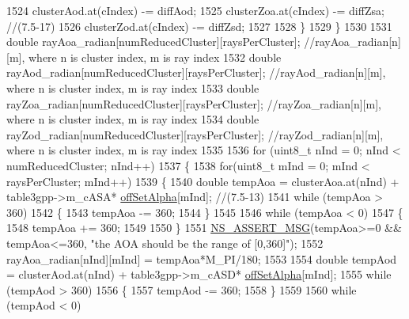 \begin{DoxyCode}
1524                         clusterAod.at(cIndex) -= diffAod;
1525                         clusterZoa.at(cIndex) -= diffZsa; \textcolor{comment}{//(7.5-17)}
1526                         clusterZod.at(cIndex) -= diffZsd;
1527 
1528                 \}
1529         \}
1530 
1531         \textcolor{keywordtype}{double} rayAoa\_radian[numReducedCluster][raysPerCluster]; \textcolor{comment}{//rayAoa\_radian[n][m], where n is cluster
       index, m is ray index}
1532         \textcolor{keywordtype}{double} rayAod\_radian[numReducedCluster][raysPerCluster]; \textcolor{comment}{//rayAod\_radian[n][m], where n is cluster
       index, m is ray index}
1533         \textcolor{keywordtype}{double} rayZoa\_radian[numReducedCluster][raysPerCluster]; \textcolor{comment}{//rayZoa\_radian[n][m], where n is cluster
       index, m is ray index}
1534         \textcolor{keywordtype}{double} rayZod\_radian[numReducedCluster][raysPerCluster]; \textcolor{comment}{//rayZod\_radian[n][m], where n is cluster
       index, m is ray index}
1535 
1536         \textcolor{keywordflow}{for} (uint8\_t nInd = 0; nInd < numReducedCluster; nInd++)
1537         \{
1538                 \textcolor{keywordflow}{for}(uint8\_t mInd = 0; mInd < raysPerCluster; mInd++)
1539                 \{
1540                         \textcolor{keywordtype}{double} tempAoa = clusterAoa.at(nInd) + table3gpp->m\_cASA*
      \hyperlink{namespacens3_a2344173eeb094a196c555a159e87bc6f}{offSetAlpha}[mInd]; \textcolor{comment}{//(7.5-13)}
1541                         \textcolor{keywordflow}{while} (tempAoa > 360)
1542                         \{
1543                                 tempAoa -= 360;
1544                         \}
1545 
1546                         \textcolor{keywordflow}{while} (tempAoa < 0)
1547                         \{
1548                                 tempAoa += 360;
1549 
1550                         \}
1551                         \hyperlink{assert_8h_aff5ece9066c74e681e74999856f08539}{NS\_ASSERT\_MSG}(tempAoa>=0 && tempAoa<=360, \textcolor{stringliteral}{"the AOA should be the range
       of [0,360]"});
1552                         rayAoa\_radian[nInd][mInd] = tempAoa*M\_PI/180;
1553 
1554                         \textcolor{keywordtype}{double} tempAod = clusterAod.at(nInd) + table3gpp->m\_cASD*
      \hyperlink{namespacens3_a2344173eeb094a196c555a159e87bc6f}{offSetAlpha}[mInd];
1555                         \textcolor{keywordflow}{while} (tempAod > 360)
1556                         \{
1557                                 tempAod -= 360;
1558                         \}
1559 
1560                         \textcolor{keywordflow}{while} (tempAod < 0)

\end{DoxyCode}
